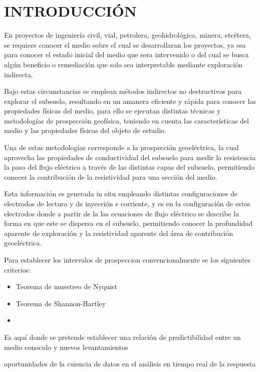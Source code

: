 \chapter{INTRODUCCIÓN}
En proyectos de ingeniería civil, vial, petrolera, geohidrológica, minera, etcétera, se requiere conocer el medio sobre el cual se desarrollaran los proyectos, ya sea para conocer el estado inicial del medio que sera intervenido o del cual se busca algún beneficio o remediación que solo sea interpretable mediante exploración indirecta.

Bajo estas circunstancias se emplean métodos indirectos no destructivos para explorar el subsuelo, resultando en un amanera eficiente y rápida para conocer las propiedades físicas del medio, para ello se ejecutan distintas técnicas y metodologías de prospección geofísica, teniendo en cuenta las características del medio y las propiedades físicas del objeto de estudio.

Una de estas metodologías corresponde a la prospección geoeléctrica, la cual aprovecha las propiedades de conductividad del subsuelo para medir la resistencia la paso del flujo eléctrico a través de las distintas capas del subsuelo, permitiendo conocer la contribución de la resistividad para una sección del medio.

Esta información es generada in situ empleando distintas configuraciones de electrodos de lectura y de inyección e corriente, y es en la configuración de estos electrodos donde a partir de la las ecuaciones de flujo eléctrico se describe la forma en que este se dispersa en el subsuelo, permitiendo conocer la profundidad aparente de exploración y la resistividad aparente del área de contribución geoeléctrica.

Para establecer los intervalos de prospeccion convencionalmente se los siguientes criterios:

\begin{itemize}
	\item Teorema de muestreo de Nyquist
	\item Teorema de Shannon-Hartley
	\item 
\end{itemize}



Es aquí donde se pretende establecer una relación de predictibilidad entre un medio conocido y nuevos levantamientos
 


oportunidades de la cuiencia de datos en el análisis en tiempo real de la respuesta 



